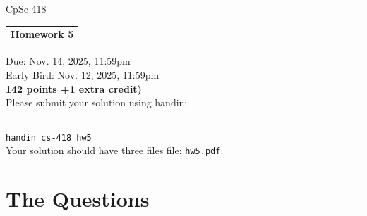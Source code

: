 \documentclass{article}
\begin{document}
\noindent%
CpSc 418 \hfill \begin{tabular}[t]{c}{\Large\bf Homework 5}\smallskip \\
\end{tabular}
\hfill Due: Nov. 14, 2025, 11:59pm\\
\hfill Early Bird: Nov. 12, 2025, 11:59pm\medskip\\
\textbf{142 points +1 extra credit)}\medskip\\
Please submit your solution using handin:\\
\rule{2em}{0ex}\texttt{handin cs-418 hw5}\\
Your solution should have three files file: \texttt{hw5.pdf}.

\section*{The Questions}
\end{document}
